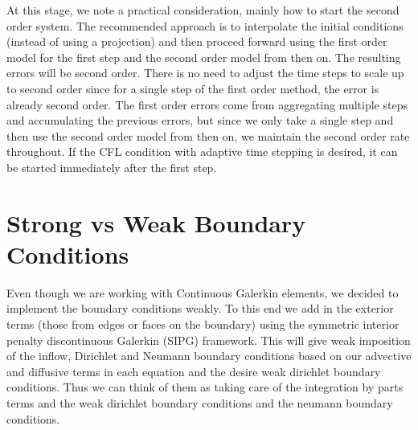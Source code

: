 \documentclass[letterpaper]{erdc}
\begin{document}
\begin{remark}
At this stage, we note a practical consideration, mainly how to start the second order system.  The recommended approach is to interpolate the initial conditions (instead of using a projection) and then proceed forward using the first order model for the first step and the second order model from then on.  The resulting errors will be second order.  There is no need to adjust the time steps to scale up to second order since for a single step of the first order method, the error is already second order.  The first order errors come from aggregating multiple steps and accumulating the previous errors, but since we only take a single step and then use the second order model from then on, we maintain the second order rate throughout.  If the CFL condition with adaptive time stepping is desired, it can be started immediately after the first step.
\end{remark}


%
%
%
\section{Strong vs Weak Boundary Conditions}\label{sec:WeakBoundaryConditions}
Even though we are working with Continuous Galerkin elements, we decided to implement the boundary conditions weakly.  To this end we add in the exterior terms (those from edges or faces on the boundary) using the symmetric interior penalty discontinuous Galerkin (SIPG) framework.  This will give weak imposition of the inflow, Dirichlet and Neumann boundary conditions based on our advective and diffusive terms in each equation and the desire weak dirichlet boundary conditions.  Thus we can think of them as taking care of the integration by parts terms and the weak dirichlet boundary conditions and the  neumann boundary conditions.
\end{document}

